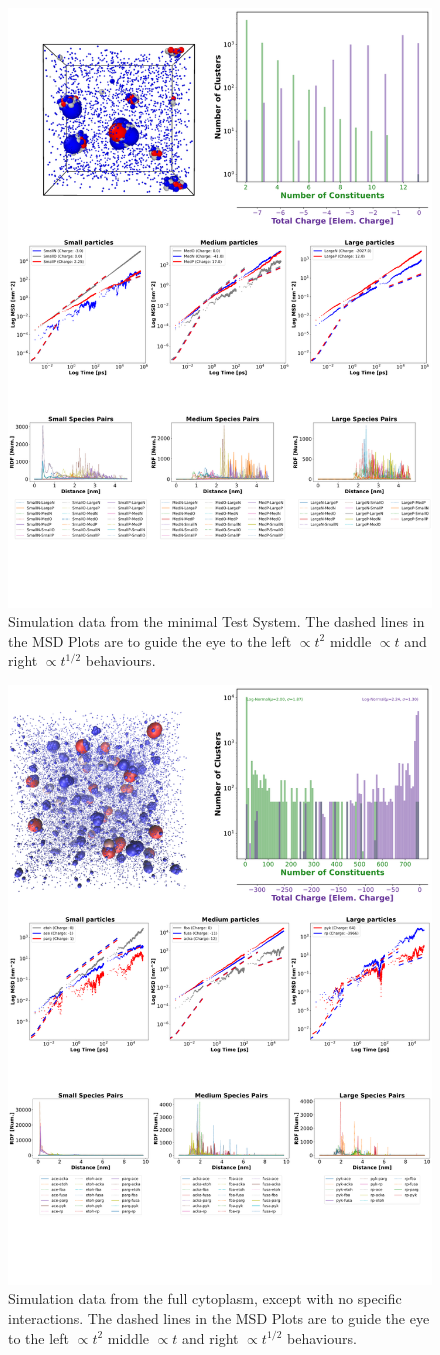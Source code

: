 \documentclass{article}
\begin{document}
\begin{figure}[!htbp]
\centering
\includegraphics[width=0.7\linewidth]{files/Fig6-a7ed5a88b4f52cd6f742db9bb56d35f3.png}
\caption[]{Simulation data from the minimal Test System. The dashed lines in the MSD Plots are to guide the eye to the left $\propto t^2$ middle $\propto t$ and right $\propto t^{1/2}$ behaviours.}
\label{Fig6_TestSys}
\end{figure}

\begin{figure}[!htbp]
\centering
\includegraphics[width=0.7\linewidth]{files/Fig7-52255c465b726bd0729aff0b90c8f0ed.png}
\caption[]{Simulation data from the full cytoplasm, except with no specific interactions. The dashed lines in the MSD Plots are to guide the eye to the left $\propto t^2$ middle $\propto t$ and right $\propto t^{1/2}$ behaviours.}
\label{Fig7_NoQTestSys}
\end{figure}
\end{document}
